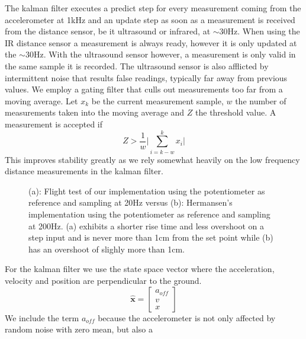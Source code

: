 The kalman filter executes a predict step for every measurement coming from the accelerometer at 1kHz and an update step as soon 
as a measurement is received from the distance sensor, be it ultrasound or infrared, at \(\sim\)30Hz. When using the IR distance 
sensor a measurement is always ready, however it is only updated at the \(\sim\)30Hz. With the ultrasound sensor however, a measurement
is only valid in the same sample it is recorded. The ultrasound sensor is also afflicted by intermittent noise that results false readings,
typically far away from previous values. We employ a gating filter that culls out measurements too far from a moving average.
Let \(x_k\) be the current measurement sample, \(w\) the number of measurements taken into the moving average and \(Z\) the threshold value.
A measurement is accepted if 
\begin{equation*}
	Z >\frac{1}{w} \lvert \sum_{i=k-w}^{k}x_i \rvert
\end{equation*}
This improves stability greatly as we rely somewhat heavily on the low frequency distance measurements in the kalman filter.
\begin{figure}
	\centering
	\subfloat[][]{\newlength\figureheight
		\newlength\figurewidth
		\setlength\figureheight{4cm}
		\setlength\figurewidth{7cm}
		
	}
	\subfloat[][]{\setlength\figureheight{4cm}
		\setlength\figurewidth{7cm}
		
	}
	\caption{(a): Flight test of our implementation using the potentiometer as reference and sampling at 20Hz versus (b):
	Hermansen's implementation using the potentiometer as reference and sampling at 200Hz. (a) exhibits a shorter rise time and less
	overshoot on a step input and is never more than 1cm from the set point while (b) has an overshoot of slighly more than 1cm.}
	\label{fig:pottest}
	\vspace{3pt}
	\hrulefill
\end{figure}
For the kalman filter we use the state space vector where the acceleration, velocity and position are perpendicular to the ground.
\begin{equation*}
	\hat{\mathbf{x}} = \begin{bmatrix}
		a_{off} \\
		v \\
		x
	\end{bmatrix}
\end{equation*}
We include the term \(a_{off}\) because the accelerometer is not only affected by random noise with zero mean, but also a 
